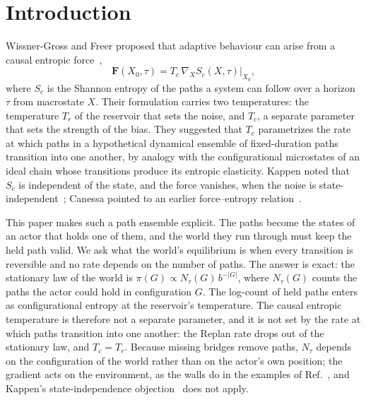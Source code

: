 \documentclass[aps,pre,preprint,superscriptaddress,nofootinbib]{revtex4-2}
\theoremstyle{definition}
\theoremstyle{remark}
\newcommand{\N}{N_\tau}
\begin{document}
\maketitle

\section{Introduction}

Wissner-Gross and Freer proposed that adaptive behaviour can arise from a causal entropic force~\cite{WissnerGross2013},
\begin{equation}
  \mathbf F(X_0,\tau)=T_c\,\nabla_X S_c(X,\tau)\big|_{X_0},
\end{equation}
where $S_c$ is the Shannon entropy of the paths a system can follow over a horizon $\tau$ from macrostate $X$. Their formulation carries two temperatures: the temperature $T_r$ of the reservoir that sets the noise, and $T_c$, a separate parameter that sets the strength of the bias. They suggested that $T_c$ parametrizes the rate at which paths in a hypothetical dynamical ensemble of fixed-duration paths transition into one another, by analogy with the configurational microstates of an ideal chain whose transitions produce its entropic elasticity. Kappen noted that $S_c$ is independent of the state, and the force vanishes, when the noise is state-independent~\cite{Kappen2013}; Canessa pointed to an earlier force--entropy relation~\cite{Canessa2013}.

This paper makes such a path ensemble explicit. The paths become the states of an actor that holds one of them, and the world they run through must keep the held path valid. We ask what the world's equilibrium is when every transition is reversible and no rate depends on the number of paths. The answer is exact: the stationary law of the world is $\pi(G)\propto\N(G)\,b^{-|G|}$, where $\N(G)$ counts the paths the actor could hold in configuration $G$. The log-count of held paths enters as configurational entropy at the reservoir's temperature. The causal entropic temperature is therefore not a separate parameter, and it is not set by the rate at which paths transition into one another: the Replan rate drops out of the stationary law, and $T_c=T_r$. Because missing bridges remove paths, $\N$ depends on the configuration of the world rather than on the actor's own position; the gradient acts on the environment, as the walls do in the examples of Ref.~\cite{WissnerGross2013}, and Kappen's state-independence objection~\cite{Kappen2013} does not apply.
\end{document}
